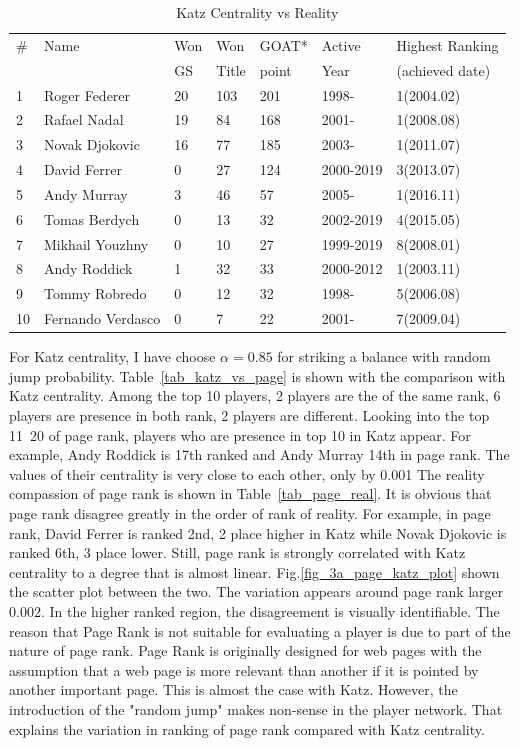 \documentclass[runningheads]{llncs}
\begin{document}
\begin{table}
\centering
\caption{Katz Centrality vs Reality} \label{tab_katz_real}
\begin{tabular}{|l|l|l|l|l|l|l|}
\hline

\# & Name & Won & Won & GOAT* & Active & Highest Ranking \\ 
 &  & GS & Title & point & Year & (achieved date) \\ \hline
1 & Roger Federer & 20 & 103 & 201 & 1998- & 1(2004.02) \\ 
2 & Rafael Nadal & 19 & 84 & 168 & 2001- & 1(2008.08) \\ 
3 & Novak Djokovic & 16 & 77 & 185 & 2003- & 1(2011.07) \\ 
4 & David Ferrer & 0 & 27 & 124 & 2000-2019 & 3(2013.07) \\ 
5 & Andy Murray & 3 & 46 & 57 & 2005- & 1(2016.11) \\ 
6 & Tomas Berdych & 0 & 13 & 32 & 2002-2019 & 4(2015.05) \\ 
7 & Mikhail Youzhny & 0 & 10 & 27 & 1999-2019 & 8(2008.01) \\ 
8 & Andy Roddick & 1 & 32 & 33 & 2000-2012 & 1(2003.11) \\ 
9 & Tommy Robredo & 0 & 12 & 32 & 1998- & 5(2006.08) \\ 
10 & Fernando Verdasco & 0 & 7 & 22 & 2001- & 7(2009.04) \\ \hline

\end{tabular}
\end{table}

For Katz centrality, I have choose \(\alpha = 0.85\) for striking a balance with random jump probability. Table~\ref{tab_katz_vs_page} is shown with the comparison with Katz centrality. Among the top 10 players, 2 players are the of the same rank, 6 players are presence in both rank, 2 players are different. Looking into the top 11~20 of page rank, players who are presence in top 10 in Katz appear.
For example, Andy Roddick is 17th ranked and Andy Murray 14th in page rank. The values of their centrality is very close to each other, only by 0.001
The reality compassion of page rank is shown in Table~\ref{tab_page_real}. It is obvious that page rank disagree greatly in the order of rank of reality. For example, in page rank, David Ferrer is ranked 2nd, 2 place higher in Katz while Novak Djokovic is ranked 6th, 3 place lower. 
Still, page rank is strongly correlated with Katz centrality to a degree that is almost linear. Fig.\ref{fig_3a_page_katz_plot} shown the scatter plot between the two. The variation appears around page rank larger 0.002. In the higher ranked region, the disagreement is visually identifiable. The reason that Page Rank is not suitable for evaluating a player is due to part of the nature of page rank. Page Rank is originally designed for web pages with the assumption that a web page is more relevant than
another if it is pointed by another important page. This is almost the case with Katz. However, the introduction of the "random jump" makes non-sense in the player network. That explains the variation in ranking of page rank compared with Katz centrality.
\end{document}
